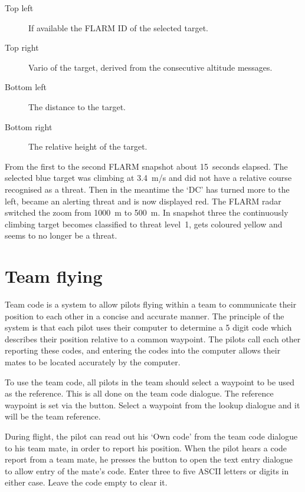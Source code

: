 \begin{description}
\item[Top left]  If available the FLARM ID of the selected target.
\item[Top right]  Vario of the target, derived from the consecutive altitude
messages.
\item[Bottom left]  The distance to the target.
\item[Bottom right]  The relative height of the target.
\end{description}

From the first to the second FLARM snapshot about 15~seconds elapsed. The
selected blue target was climbing at 3.4~m/s and did not have a relative course
recognised as a threat.  Then in the meantime the `DC' has turned more to
the left, became an alerting threat and is now displayed red.  The FLARM
radar switched the zoom from 1000~m to 500~m. In snapshot three the
continuously climbing target becomes classified to threat level~1, gets
coloured yellow and seems to no longer be a threat.


\section{Team flying}\label{sec:team-flying}

Team code is a system to allow pilots flying within a team to 
communicate their position to each other in a concise and accurate 
manner.  The principle of the system is that each pilot uses their 
computer to determine a 5 digit code which describes their position 
relative to a common waypoint.  The pilots call each other reporting 
these codes, and entering the codes into the computer allows their 
mates to be located accurately by the computer. 

To use the team code, all pilots in the team should select a waypoint to 
be used as the reference.  This is all done on the team code dialogue. 
The reference waypoint is set 
via the  button. Select a waypoint from the lookup dialogue 
and it will be the team reference.

During flight, the pilot can read out his `Own code' from the team 
code dialogue to his team mate, in order to report his position.  When 
the pilot hears a code report from a team mate, he presses the  
button to open the text entry dialogue to allow entry of the mate's code.
Enter three to five ASCII letters or digits in either case.
Leave the code empty to clear it.

